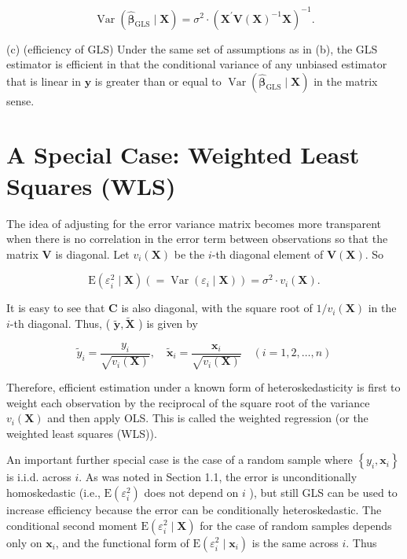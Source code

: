 \documentclass[10pt]{article}
\begin{document}
$$
\operatorname{Var}\left(\widehat{\boldsymbol{\beta}}_{\mathrm{GLS}} \mid \mathbf{X}\right)=\sigma^{2} \cdot\left(\mathbf{X}^{\prime} \mathbf{V}(\mathbf{X})^{-1} \mathbf{X}\right)^{-1} .
$$

(c) (efficiency of GLS) Under the same set of assumptions as in (b), the GLS estimator is efficient in that the conditional variance of any unbiased estimator that is linear in $\mathbf{y}$ is greater than or equal to $\operatorname{Var}\left(\widehat{\boldsymbol{\beta}}_{\mathrm{GLS}} \mid \mathbf{X}\right)$ in the matrix sense.

\section*{A Special Case: Weighted Least Squares (WLS)}
The idea of adjusting for the error variance matrix becomes more transparent when there is no correlation in the error term between observations so that the matrix $\mathbf{V}$ is diagonal. Let $v_{i}(\mathbf{X})$ be the $i$-th diagonal element of $\mathbf{V}(\mathbf{X})$. So

$$
\mathrm{E}\left(\varepsilon_{i}^{2} \mid \mathbf{X}\right)\left(=\operatorname{Var}\left(\varepsilon_{i} \mid \mathbf{X}\right)\right)=\sigma^{2} \cdot v_{i}(\mathbf{X}) .
$$

It is easy to see that $\mathbf{C}$ is also diagonal, with the square root of $1 / v_{i}(\mathbf{X})$ in the $i$-th diagonal. Thus, ( $\tilde{\mathbf{y}}, \tilde{\mathbf{X}}$ ) is given by

$$
\tilde{y}_{i}=\frac{y_{i}}{\sqrt{v_{i}(\mathbf{X})}}, \quad \tilde{\mathbf{x}}_{i}=\frac{\mathbf{x}_{i}}{\sqrt{v_{i}(\mathbf{X})}} \quad(i=1,2, \ldots, n)
$$

Therefore, efficient estimation under a known form of heteroskedasticity is first to weight each observation by the reciprocal of the square root of the variance $v_{i}(\mathbf{X})$ and then apply OLS. This is called the weighted regression (or the weighted least squares (WLS)).

An important further special case is the case of a random sample where $\left\{y_{i}, \mathbf{x}_{i}\right\}$ is i.i.d. across $i$. As was noted in Section 1.1, the error is unconditionally homoskedastic (i.e., $\mathrm{E}\left(\varepsilon_{i}^{2}\right)$ does not depend on $i$ ), but still GLS can be used to increase efficiency because the error can be conditionally heteroskedastic. The conditional second moment $\mathrm{E}\left(\varepsilon_{i}^{2} \mid \mathbf{X}\right)$ for the case of random samples depends only on $\mathbf{x}_{i}$, and the functional form of $\mathrm{E}\left(\varepsilon_{i}^{2} \mid \mathbf{x}_{i}\right)$ is the same across $i$. Thus
\end{document}
